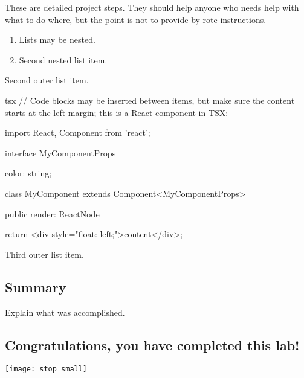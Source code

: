 \documentclass[../workbook]{subfiles}
\begin{document}
\begin{numbers}
    \item These are detailed project steps. They should help anyone who needs help with what to do where, but the point is not to provide by-rote instructions.
        \begin{enumerate}
            \item Lists may be nested.
            \item Second nested list item.
        \end{enumerate}
    \item Second outer list item.
    \begin{codeblock}{tsx}
// Code blocks may be inserted between items, but make sure the content starts at the left margin; this is a React component in TSX:

import React, { Component } from 'react';

interface MyComponentProps {

    color: string;
}

class MyComponent extends Component<MyComponentProps> {

    public render: ReactNode {

        return <div style="float: left;">content</div>;
    }
}
    \end{codeblock}%
    \item Third outer list item.
\end{numbers}



\subsection*{Summary}

\par{
    Explain what was accomplished.
}


\subsection*{\textbf{Congratulations, you have completed this lab!}}
\texttt{[image: stop\_small]}
\end{document}
